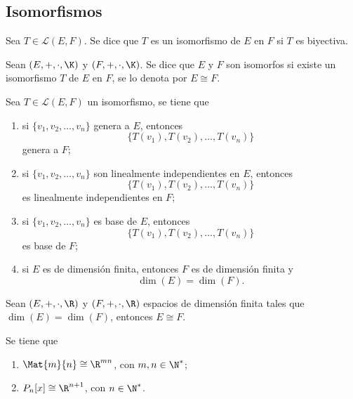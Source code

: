 \documentclass[a4,11pt]{aleph-notas}
\begin{document}
\subsection{Isomorfismos}


\begin{defi}[Isomorfismo]
    Sea $T \in \mathcal{L}(E,F)$. Se dice que $T$ es un isomorfismo de $E$ en $F$ si $T$ es biyectiva.
\end{defi}

\begin{defi}
    Sean $(E,+,\cdot,\K)$ y $(F,+,\cdot,\K)$. Se dice que $E$ y $F$ son isomorfos si existe un isomorfismo $T$ de $E$ en $F$, se lo denota por $E \cong F$.
\end{defi}

\begin{teo}
    Sea $T \in \mathcal{L}(E,F)$ un isomorfismo, se tiene que
    \begin{enumerate}
    \item 
        si $\{v_1, v_2, \ldots, v_n\}$ genera a $E$, entonces 
        \[
            \{T(v_1), T(v_2), \ldots, T(v_n)\}
        \]
        genera a $F$;
    \item 
        si $\{v_1, v_2, \ldots, v_n\}$ son linealmente independientes en $E$, entonces 
        \[
            \{T(v_1), T(v_2), \ldots, T(v_n)\}
        \] 
        es linealmente independientes en $F$;
    \item 
        si $\{v_1, v_2, \ldots, v_n\}$ es base de $E$, entonces
        \[
            \{T(v_1), T(v_2), \ldots, T(v_n)\}
        \]
        es base de $F$; 
    \item 
        si $E$ es de dimensión finita, entonces $F$ es de dimensión finita y 
        \[
            \dim(E) = \dim(F).
        \]
    \end{enumerate}
\end{teo} 

\begin{teo}
    Sean $(E,+,\cdot,\R)$ y $(F,+,\cdot,\R)$ espacios de dimensión finita tales que $\dim(E) = \dim(F)$, entonces $E \cong F$.
\end{teo}

\begin{teo}
    Se tiene que
    \begin{enumerate}
        \item $\Mat{m}{n} \cong \R^{mn}$, con $m,n\in\N^*$;
        \item $P_n[x] \cong \R^{n+1}$, con $n\in\N^*$.
    \end{enumerate}
\end{teo}
\end{document}
